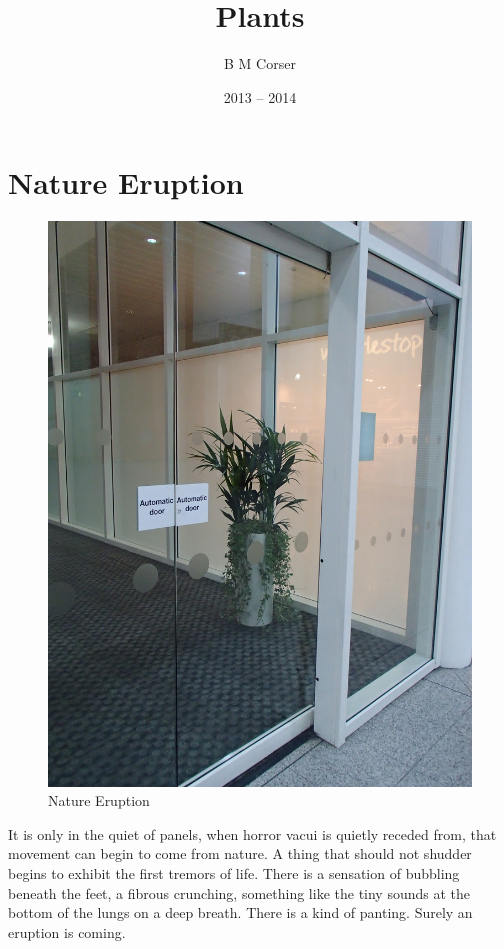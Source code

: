 \documentclass{book}
\title{Plants}
\author{B M Corser}
\date{2013 -- 2014}
\begin{document}
\maketitle

\tableofcontents

\chapter{Nature Eruption}

\begin{figure}
\centering
\includegraphics[width=\textwidth,angle=90]{figures/P1050140.JPG}
\caption{Nature Eruption}
\end{figure}

It is only in the quiet of panels, when horror vacui is quietly receded from,
that movement can begin to come from nature. A thing that should not shudder
begins to exhibit the first tremors of life. There is a sensation of bubbling
beneath the feet, a fibrous crunching, something like the tiny sounds at the
bottom of the lungs on a deep breath. There is a kind of panting. Surely an
eruption is coming.
\end{document}
